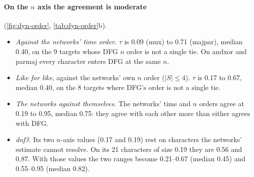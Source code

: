 \begin{table}[tbp]
\centering{\footnotesize\setlength{\tabcolsep}{3.2pt}
}
\caption{DFG alone's order against the Part~5 networks' . (a)~Per grid size: the fits (of 33) in which the target's characters enter DFG's model over two or more rounds; the mean Kendall $\tau$ between the networks' online onset order and DFG's round order over those fits (a character carried only by a sum block counts half a round later); how many of them are positive. (b)~Per target, Kendall $\tau_b$ over its Fourier characters (``tied'': one of the two orders is a single tie). The columns are: the networks' onset order in Part~5's run on the same 16384 training rows against DFG's round-0 priority there (mean of 3 seeds, seed $s$ against seed $s$); the networks' online onset order against DFG's $n$ order (median seed); the pairs the networks order (onsets more than 1.35 times apart) that DFG's $n$ order keeps, ties or inverts; the networks' $n$ order against DFG's ($|S|\le4$; the characters in brackets); the networks' time order against their $n$ order. The last two columns give the networks' time order and DFG's $n$ order against degree and against $1/|\hat f(S)|$; positive means that higher degree, or a smaller coefficient, comes later. dnf3$^*$: dnf3's 21 characters of size 0.19, which the networks' $n$-axis estimate can resolve. Source: .}
\label{tab:dyn-order}
\end{table}

\paragraph{On the $n$ axis the agreement is moderate}  (\cref{fig:dyn-order}, \cref{tab:dyn-order}b).
\begin{itemize}
\item \emph{Against the networks' time order.} $\tau$ is 0.09 (mux) to 0.71 (majpar), median 0.40, on the 9 targets whose DFG $n$ order is not a single tie. On andxor and parmaj every character enters DFG at the same $n$.
\item \emph{Like for like}, against the networks' own $n$ order ($|S|\le4$). $\tau$ is 0.17 to 0.67, median 0.40, on the 8 targets where DFG's order is not a single tie.
\item \emph{The networks against themselves.} The networks' time and $n$ orders agree at 0.19 to 0.95, median 0.75: they agree with each other more than either agrees with DFG.
\item \emph{dnf3.} Its two $n$-axis values (0.17 and 0.19) rest on characters the networks' estimate cannot resolve. On its 21 characters of size 0.19 they are 0.56 and 0.87. With those values the two ranges become 0.21--0.67 (median 0.45) and 0.55--0.95 (median 0.82).
\end{itemize}

